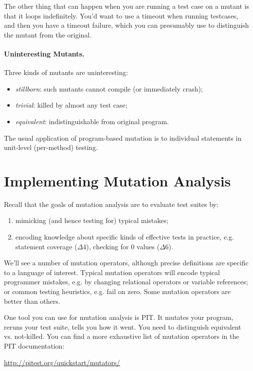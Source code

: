 \documentclass[11pt]{article}
\begin{document}
The other thing that can happen when you are running a test case on a mutant is
that it loops indefinitely. You'd want to use a timeout when running testcases,
and then you have a timeout failure, which you can presumably use to distinguish
the mutant from the original.

\paragraph{Uninteresting Mutants.} Three kinds of mutants are uninteresting:
\begin{itemize}[noitemsep]
\item \emph{stillborn}: such mutants cannot compile (or immediately crash);
\item \emph{trivial}: killed by almost any test case;
\item \emph{equivalent}: indistinguishable from original program.
\end{itemize}

The usual application of program-based mutation is to individual statements
in unit-level (per-method) testing.

\section*{Implementing Mutation Analysis}
Recall that the goals of mutation analysis are to evaluate test suites by:
\begin{enumerate}[noitemsep]
\item mimicking (and hence testing for) typical mistakes;
\item encoding knowledge about specific kinds of effective tests in practice, e.g.
statement coverage ($\Delta 4$), checking for 0 values ($\Delta 6$).
\end{enumerate}

We'll see a number of mutation operators, although precise
definitions are specific to a language of interest. Typical mutation
operators will encode typical programmer mistakes, e.g. by changing
relational operators or variable references; or common testing heuristics, 
e.g. fail on zero. Some mutation operators are better than others.

One tool you can use for mutation analysis is PIT.  It mutates your
program, reruns your test suite, tells you how it went. You need to
distinguish equivalent vs. not-killed.  You can find a more exhaustive
list of mutation operators in the PIT documentation:

\begin{center}
\url{http://pitest.org/quickstart/mutators/}
\end{center}
\end{document}

